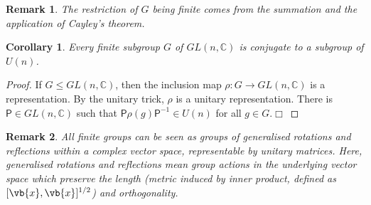 \documentclass{article}
\theoremstyle{plain}\theoremheaderfont{\normalfont\itshape}\theorembodyfont{\rmfamily}\theoremseparator{.}\newtheorem*{rem}{Remark}\newtheorem*{ex}{Example}\newtheorem*{proof}{Proof}\newtheorem*{altp}{Alternative proof}
\theoremstyle{plain}\theoremheaderfont{\normalfont\bfseries}\theorembodyfont{\rmfamily}\theoremseparator{.}\newtheorem{thm}{Theorem}[section]\newtheorem{lem}[thm]{Lemma}\newtheorem{prop}[thm]{Proposition}\newtheorem*{cor}{Corollary}\newtheorem{defn}[thm]{Definition}\newtheorem{clm}[thm]{Claim}\newtheorem{clminproof}{Claim}
\theoremstyle{break}\theoremheaderfont{\normalfont\itshape}\theorembodyfont{\rmfamily}\theoremseparator{.\medskip}\newtheorem*{proofskip}{Proof}\newtheorem*{exs}{Examples}\newtheorem*{rems}{Remarks}
\theoremstyle{break}\theoremheaderfont{\normalfont\bfseries}\theorembodyfont{\rmfamily}\theoremseparator{.\medskip}\newtheorem{lemskip}[thm]{Lemma}\newtheorem{defnskip}[thm]{Definition}\newtheorem{propskip}[thm]{Proposition}\newtheorem{thmskip}[thm]{Theorem}
\numberwithin{equation}{section}
\newcommand{\qed}{\hfill\ensuremath{\Box}}
\begin{document}
	\begin{rem}
		The restriction of \(G\) being finite comes from the summation and the application of Cayley's theorem.
	\end{rem}
	\begin{cor}
		Every finite subgroup \(G\) of \(GL(n,\mathbb{C})\) is conjugate to a subgroup of \(U(n)\).
	\end{cor}
	\begin{proof}
		If \(G\le GL(n,\mathbb{C})\), then the inclusion map \(\rho:G\to GL(n,\mathbb{C})\) is a representation. By the unitary trick, \(\rho\) is a unitary representation. There is \(\mathsf{P}\in GL(n,\mathbb{C})\) such that \(\mathsf{P}\rho(g)\mathsf{P}^{-1}\in U(n)\) for all \(g\in G\).\qed
	\end{proof}
	\begin{rem}
		All finite groups can be seen as groups of generalised rotations and reflections within a complex vector space, representable by unitary matrices. Here, generalised rotations and reflections mean group actions in the underlying vector space which preserve the length (metric induced by inner product, defined as \([\vb{x},\vb{x}]^{1/2}\)) and orthogonality. 
	\end{rem}
\end{document}
